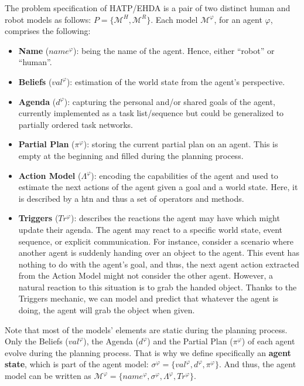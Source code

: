 The problem specification of HATP/EHDA is a pair of two distinct human and robot models as follows: $P = \{ \mathcal{M}^H, \mathcal{M}^R \}$. Each model $\mathcal{M}^\varphi$, for an agent $\varphi$, comprises the following:
\begin{itemize}
    \item \textbf{Name} ($name^{\varphi}$): being the name of the agent. Hence, either ``robot'' or ``human''.
    
    \item \textbf{Beliefs} ($val^{\varphi}$): estimation of the world state from the agent's perspective.
    
    \item \textbf{Agenda} ($d^{\varphi}$): capturing the personal and/or shared goals of the agent, currently implemented as a task list/sequence but could be generalized to partially ordered task networks.
    
    \item \textbf{Partial Plan} ($\pi^{\varphi}$): storing the current partial plan on an agent. This is empty at the beginning and filled during the planning process.
    
    \item \textbf{Action Model} ($\Lambda^{\varphi}$): encoding the capabilities of the agent and used to estimate the next actions of the agent given a goal and a world state. Here, it is described by a \acrfull{htn} and thus a set of operators and methods. 
    
    \item \textbf{Triggers} ($Tr^{\varphi}$): describes the reactions the agent may have which might update their agenda. The agent may react to a specific world state, event sequence, or explicit communication. For instance, consider a scenario where another agent is suddenly handing over an object to the agent. This event has nothing to do with the agent's goal, and thus, the next agent action extracted from the Action Model might not consider the other agent. However, a natural reaction to this situation is to grab the handed object. Thanks to the Triggers mechanic, we can model and predict that whatever the agent is doing, the agent will grab the object when given.  
\end{itemize}

Note that most of the models' elements are static during the planning process. Only the Beliefs ($val^{\varphi}$), the Agenda ($d^{\varphi}$) and the Partial Plan ($\pi^{\varphi}$) of each agent evolve during the planning process. That is why we define specifically an \textbf{agent state}, which is part of the agent model:
$\sigma^{\varphi} = \{ val^{\varphi}, d^{\varphi}, \pi^{\varphi} \}$. 
And thus, the agent model can be written as $\mathcal{M}^{\varphi} = \{ name^{\varphi}, \sigma^{\varphi}, \Lambda^{\varphi}, Tr^{\varphi} \}$.


